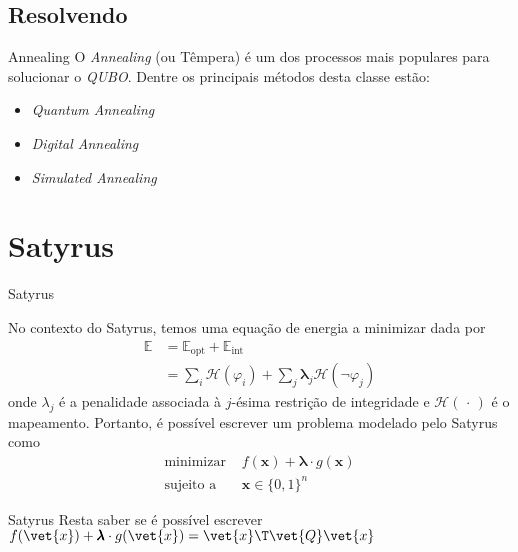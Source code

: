 \documentclass[brazil, MathSerif, aspectratio = 169]{beamer}
\begin{document}

\subsection{Resolvendo}

\begin{frame}{Annealing}
    O \emph{Annealing} (ou Têmpera) é um dos processos mais populares para solucionar o \emph{QUBO}. Dentre os principais métodos desta classe estão:
    \begin{itemize}[<+-|structure@+>]
        \item \emph{Quantum Annealing}
        \item \emph{Digital Annealing}
        \item \emph{Simulated Annealing}
    \end{itemize}
\end{frame}

\section{Satyrus}

\begin{frame}{Satyrus}

    No contexto do Satyrus, temos uma equação de energia a minimizar dada por
        \begin{align*}
            \mathbb{E} &= \mathbb{E}_\text{opt} + \mathbb{E}_\text{int}\\
                       &= \sum_{i} \mathcal{H} \left( \varphi_i \right) %
                       + \sum_j \pmb{\lambda}_j \mathcal{H} \left( \neg \varphi_j \right)
        \end{align*}
    onde $\lambda_j$ é a penalidade associada à $j$-ésima restrição de integridade e $\mathcal{H} \left(\,\cdot\,\right)$ é o mapeamento. Portanto, é possível escrever um problema modelado pelo Satyrus como
        \begin{align*}
            \text{minimizar } &f(\mathbf{x}) + \pmb{\lambda} \cdot g(\mathbf{x})\\
            \text{sujeito a } &\mathbf{x} \in \{0, 1\}^{n}
        \end{align*}
\end{frame}

\begin{frame}{Satyrus}%
    Resta saber se é possível escrever
        $f(\vet{x}) + \pmb{\lambda} \cdot g(\vet{x}) = \vet{x}\T \vet{Q} \vet{x}$
    
    
\end{frame}
\end{document}
